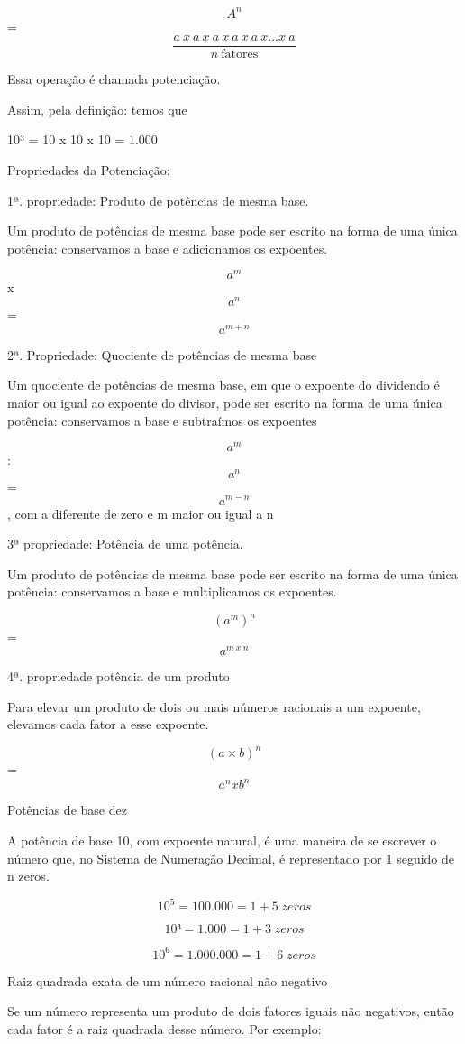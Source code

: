 \[A^n\] =
\[\frac{a\ x\ a\ x\ a\ x\ a\ x\ a\ x\ldots x\ a}{n\ \text{fatores}}\]

Essa operação é chamada potenciação.

Assim, pela definição: temos que

10³ = 10 x 10 x 10 = 1.000

Propriedades da Potenciação:

1ª. propriedade: Produto de potências de mesma base.

Um produto de potências de mesma base pode ser escrito na forma de uma
única potência: conservamos a base e adicionamos os expoentes.

\[a^m\] x \[a^n\] = \[a^{m+n}\]

2ª. Propriedade: Quociente de potências de mesma base

Um quociente de potências de mesma base, em que o expoente do dividendo
é maior ou igual ao expoente do divisor, pode ser escrito na forma de
uma única potência: conservamos a base e subtraímos os expoentes

\[a^m\] : \[a^n\] = \[a^{m-n}\] , com a diferente de zero e m maior ou
igual a n

3ª propriedade: Potência de uma potência.

Um produto de potências de mesma base pode ser escrito na forma de uma
única potência: conservamos a base e multiplicamos os expoentes.

\[(a^m)^n\] = \[a^{m\ x\ n}\]

4ª. propriedade potência de um produto

Para elevar um produto de dois ou mais números racionais a um expoente,
elevamos cada fator a esse expoente.

\[(a \times b)^n\]= \[a^n x b^n\]

Potências de base dez

A potência de base 10, com expoente natural, é uma maneira de se
escrever o número que, no Sistema de Numeração Decimal, é representado
por 1 seguido de n zeros.

\[10^5 = 100.000 = 1 + 5 \;zeros\]

\[10³ = 1.000 = 1+ 3 \;zeros\]

\[10 ^6= 1.000.000 = 1+ 6 \;zeros\]

Raiz quadrada exata de um número racional não negativo

Se um número representa um produto de dois fatores iguais não negativos,
então cada fator é a raiz quadrada desse número. Por exemplo:

